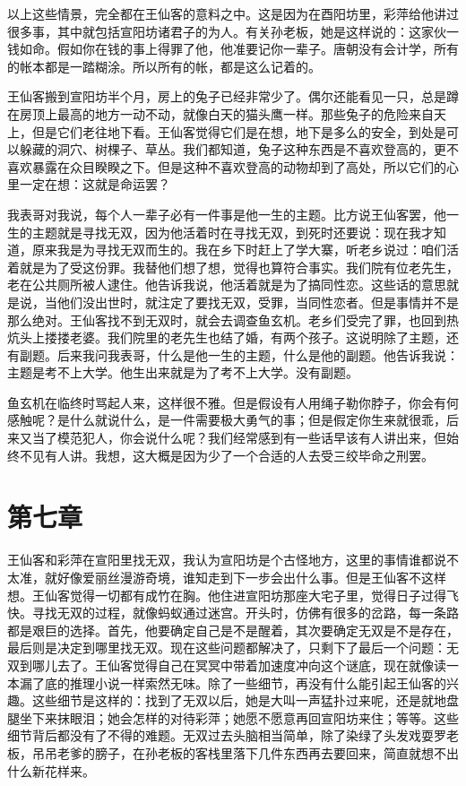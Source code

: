 以上这些情景，完全都在王仙客的意料之中。这是因为在酉阳坊里，彩萍给他讲过很多事，其中就包括宣阳坊诸君子的为人。有关孙老板，她是这样说的：这家伙一钱如命。假如你在钱的事上得罪了他，他准要记你一辈子。唐朝没有会计学，所有的帐本都是一踏糊涂。所以所有的帐，都是这么记着的。 

王仙客搬到宣阳坊半个月，房上的兔子已经非常少了。偶尔还能看见一只，总是蹲在房顶上最高的地方一动不动，就像白天的猫头鹰一样。那些兔子的危险来自天上，但是它们老往地下看。王仙客觉得它们是在想，地下是多么的安全，到处是可以躲藏的洞穴、树棵子、草丛。我们都知道，兔子这种东西是不喜欢登高的，更不喜欢暴露在众目睽睽之下。但是这种不喜欢登高的动物却到了高处，所以它们的心里一定在想：这就是命运罢？ 

我表哥对我说，每个人一辈子必有一件事是他一生的主题。比方说王仙客罢，他一生的主题就是寻找无双，因为他活着时在寻找无双，到死时还要说：现在我才知道，原来我是为寻找无双而生的。我在乡下时赶上了学大寨，听老乡说过：咱们活着就是为了受这份罪。我替他们想了想，觉得也算符合事实。我们院有位老先生，老在公共厕所被人逮住。他告诉我说，他活着就是为了搞同性恋。这些话的意思就是说，当他们没出世时，就注定了要找无双，受罪，当同性恋者。但是事情并不是那么绝对。王仙客找不到无双时，就会去调查鱼玄机。老乡们受完了罪，也回到热炕头上搂搂老婆。我们院里的老先生也结了婚，有两个孩子。这说明除了主题，还有副题。后来我问我表哥，什么是他一生的主题，什么是他的副题。他告诉我说：主题是考不上大学。他生出来就是为了考不上大学。没有副题。 

鱼玄机在临终时骂起人来，这样很不雅。但是假设有人用绳子勒你脖子，你会有何感触呢？是什么就说什么，是一件需要极大勇气的事；但是假定你生来就很乖，后来又当了模范犯人，你会说什么呢？我们经常感到有一些话早该有人讲出来，但始终不见有人讲。我想，这大概是因为少了一个合适的人去受三绞毕命之刑罢。

\section{第七章}

王仙客和彩萍在宣阳里找无双，我认为宣阳坊是个古怪地方，这里的事情谁都说不太准，就好像爱丽丝漫游奇境，谁知走到下一步会出什么事。但是王仙客不这样想。王仙客觉得一切都有成竹在胸。他住进宣阳坊那座大宅子里，觉得日子过得飞快。寻找无双的过程，就像蚂蚁通过迷宫。开头时，仿佛有很多的岔路，每一条路都是艰巨的选择。首先，他要确定自己是不是醒着，其次要确定无双是不是存在，最后则是决定到哪里找无双。现在这些问题都解决了，只剩下了最后一个问题：无双到哪儿去了。王仙客觉得自己在冥冥中带着加速度冲向这个谜底，现在就像读一本漏了底的推理小说一样索然无味。除了一些细节，再没有什么能引起王仙客的兴趣。这些细节是这样的：找到了无双以后，她是大叫一声猛扑过来呢，还是就地盘腿坐下来抹眼泪；她会怎样的对待彩萍；她愿不愿意再回宣阳坊来住；等等。这些细节背后都没有了不得的难题。无双过去头脑相当简单，除了染绿了头发戏耍罗老板，吊吊老爹的膀子，在孙老板的客栈里落下几件东西再去要回来，简直就想不出什么新花样来。 


